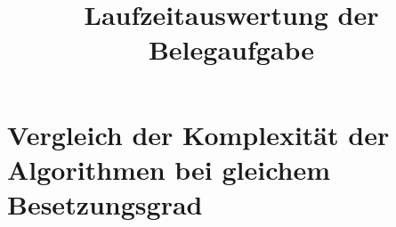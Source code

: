 \documentclass[10pt,DIV=15,a4paper]{scrartcl}
\begin{document}
  \title{Laufzeitauswertung der Belegaufgabe}

  \maketitle

  \tableofcontents

  \listoffigures

  \newcommand{\datatablename}{performance.csv}
  \newcommand{\performanceplot}[2]{
    \addplot+ [
      sharp plot,
      discard if not={dichte}{#1}
    ] table[x=groesse,y=#2,col sep=comma] {\datatablename};
  }

  \newcommand{\plottingDichte}[2][]{
    \begin{tikzpicture}
      \begin{axis}[
        xlabel={Grösse der Matrix},
        ylabel=Zeit,
       legend style={
       cells={anchor=east},
       legend pos=outer north east,
       },
       cycle list name=mylist
       ]

        \performanceplot{#2}{#1Zeit1}
        \performanceplot{#2}{#1Zeit2}
        \performanceplot{#2}{#1Zeit3}
        \performanceplot{#2}{#1Zeit4}
        \legend{\textsc{Laplace}, \textsc{Laplace} mit Absuchen, Dreiecksform, Dreieckf. mit Pivotisierung}
      \end{axis}
    \end{tikzpicture}
  }

  \newcommand{\DichtePlots}[1]{
    \begin{figure}[h]
    \centering
      \plottingDichte{#1}
    \caption{Durchschnittliche Laufzeit der unterschiedlichen Algorithmen bei $#1\%$ Besetzungsgrad.}
    \end{figure}

    \begin{figure}[h]
    \centering
      \plottingDichte[min]{#1}
    \caption{Kleinste Laufzeit der unterschiedlichen Algorithmen bei $#1\%$ Besetzungsgrad.}
    \end{figure}

    \begin{figure}[h]
    \centering
      \plottingDichte[max]{#1}
    \caption{Größte Laufzeit der unterschiedlichen Algorithmen bei $#1\%$ Besetzungsgrad.}
    \end{figure}
  }

  \section{Vergleich der Komplexität der Algorithmen bei gleichem Besetzungsgrad}
\end{document}
